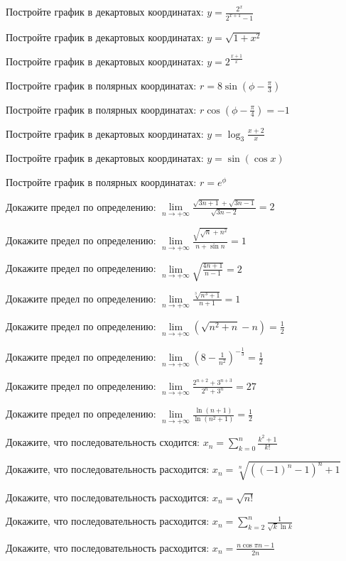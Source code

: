 \documentclass[russian]{article}
\begin{document}
Постройте график в декартовых координатах:
$y = \frac{2^x}{2^{x + 1} - 1}$

Постройте график в декартовых координатах:
$y = \sqrt{1 + x^2}$

Постройте график в декартовых координатах:
$y = 2^\frac{x + 1}{x}$

Постройте график в полярных координатах:
$r = 8\sin(\phi - \frac{\pi}{3})$

Постройте график в полярных координатах:
$r\cos(\phi - \frac{\pi}{4}) = -1$

Постройте график в декартовых координатах:
$y = \log_3\frac{x + 2}{x}$

Постройте график в декартовых координатах:
$y = \sin(\cos x)$

Постройте график в полярных координатах:
$r = e^\phi$


Докажите предел по определению:
$\lim\limits_{n\to+\infty}\frac{\sqrt{3n + 1} + \sqrt{3n - 1}}{\sqrt{3n - 2}}=2$

Докажите предел по определению:
$\lim\limits_{n\to+\infty}\frac{\sqrt{\sqrt{n} + n^2}}{n + \sin{n}}=1$

Докажите предел по определению:
$\lim\limits_{n\to+\infty}\sqrt{\frac{4n + 1}{n - 1}}=2$

Докажите предел по определению:
$\lim\limits_{n \to +\infty} \frac{\sqrt[3]{n^3 + 1}}{n + 1} = 1$

Докажите предел по определению:
$\lim\limits_{n \to +\infty} (\sqrt{n^2 + n} - n) = \frac{1}{2}$

Докажите предел по определению:
$\lim\limits_{n \to +\infty} \left(8 - \frac{1}{n^2}\right)^{-\frac{1}{3}} = \frac{1}{2}$

Докажите предел по определению:
$\lim\limits_{n \to +\infty} \frac{2^{n + 2} + 3^{n + 3}}{2^n + 3^n} = 27$

Докажите предел по определению:
$\lim\limits_{n \to +\infty} \frac{\ln(n + 1)}{\ln(n^2 + 1)} = \frac{1}{2}$


Докажите, что последовательность сходится:
$x_n=\sum_{k = 0}^{n}\frac{k^2 + 1}{k!}$

Докажите, что последовательность расходится:
$x_n = \sqrt[n]{((-1)^n - 1)^n + 1}$

Докажите, что последовательность расходится:
$x_n = \sqrt{n!}$

Докажите, что последовательность расходится:
$x_n = \sum_{k = 2}^n \frac{1}{\sqrt{k} \ln k}$

Докажите, что последовательность расходится:
$x_n = \frac{n \cos\pi n - 1}{2n}$
\end{document}
